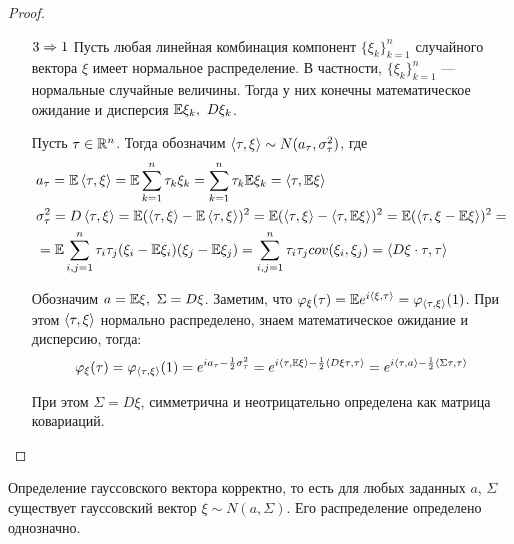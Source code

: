 \begin{proof}
\begin{itemize}
        \item[$3 \Rightarrow 1$] Пусть любая линейная комбинация компонент $\{\xi_k\}_{k = 1}^n$ случайного вектора $\xi$ имеет нормальное распределение. В частности, $\{\xi_k\}_{k = 1}^n$ --- нормальные случайные величины. Тогда у них конечны математическое ожидание и дисперсия $\E\xi_k,\ D\xi_k$.

        Пусть $\tau \in \mathbb{R}^n$. Тогда обозначим $\left\langle\tau, \xi\right\rangle \sim N(a_\tau, \sigma_\tau^2)$, где
        \begin{align*}
            & a_\tau = \mathbb{E} \left\langle\tau, \xi\right\rangle = \mathbb{E}\sum_{k = 1}^n \tau_k \xi_k = \sum_{k = 1}^n \tau_k \mathbb{E}\xi_k = \left\langle\tau, \mathbb{E}\xi\right\rangle
            \\
            & \sigma_\tau^2 = D \left\langle\tau, \xi\right\rangle = \mathbb{E} (\left\langle\tau, \xi\right\rangle - \mathbb{E} \left\langle\tau, \xi\right\rangle)^2 = \mathbb{E} (\left\langle\tau, \xi\right\rangle - \left\langle\tau, \mathbb{E}\xi\right\rangle)^2 = \mathbb{E} (\left\langle\tau, \xi - \mathbb{E}\xi\right\rangle)^2 =
            \\
            & = \mathbb{E}\sum_{i, j = 1}^{n} \tau_i \tau_j (\xi_i - \mathbb{E}\xi_i) (\xi_j - \mathbb{E}\xi_j) = \sum_{i, j = 1}^{n} \tau_i \tau_j cov(\xi_i, \xi_j) = \left\langle D\xi \cdot \tau, \tau\right\rangle
        \end{align*}

        Обозначим $a = \mathbb{E}\xi,\ \Sigma = D\xi$. Заметим, что $\varphi_\xi(\tau) = \mathbb{E} e^{i \left\langle\xi, \tau\right\rangle} = \varphi_{\left\langle\tau, \xi\right\rangle}(1)$. При этом $\left\langle\tau, \xi\right\rangle$ нормально распределено, знаем математическое ожидание и дисперсию, тогда:
        \[
            \varphi_\xi(\tau) = \varphi_{\left\langle\tau, \xi\right\rangle}(1) = e^{i a_\tau - \frac{1}{2} \sigma_\tau^2} = e^{i \left\langle\tau, \mathbb{E}\xi\right\rangle - \frac{1}{2} \left\langle D\xi \tau, \tau\right\rangle} = e^{i \left\langle\tau, a\right\rangle - \frac{1}{2} \left\langle\Sigma \tau, \tau\right\rangle}
        \]

        При этом $\Sigma = D\xi$, симметрична и неотрицательно определена как матрица ковариаций.
    \end{itemize}
\end{proof}

\begin{corollary}
    Определение гауссовского вектора корректно, то есть для любых заданных $a$, $\Sigma$ существует гауссовский вектор $\xi \sim N(a, \Sigma).$ Его распределение определено однозначно.
\end{corollary}

